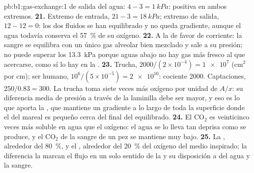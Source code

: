 \begin{solution}{pb:b1:gas-exchange:1}
de salida del agua: $4 - 3 = \qty{1}{kPa}$: positiva en ambos extremos.
\textbf{21.} Extremo de entrada, $21 - 3 = \qty{18}{kPa}$; extremo de
salida, $12 - 12 =
0$: los dos fluidos se han equilibrado y no queda
gradiente, aunque el agua todavía conserva el \qty{57}{\%} de su oxígeno.
\textbf{22.} A la de favor de corriente: la sangre se equilibra con un único
gas alveolar bien mezclado y sale a su presión; no puede superar los
\qty{13.3}{kPa} porque aguas abajo no hay gas más fresco al que acercarse,
como sí lo hay en la .
\textbf{23.} Trucha, $2000/(2\times 10^{-4}) = \num{1e7}$ (cm$^2$ por cm);
ser humano, $10^6/(5\times 10^{-5}) = \num{2e10}$: cociente \num{2000}.
Captaciones, $250/0.83 = 300$. La trucha toma siete veces más oxígeno por
unidad de $A/x$: su diferencia media de presión a través de la laminilla
debe ser mayor, y eso es lo que aporta la , que mantiene un
gradiente a lo largo de toda la superficie donde el del  mareal es
pequeño cerca del final del equilibrado.
\textbf{24.} El $\mathrm{CO_2}$ es veinticinco veces más soluble en agua que
el oxígeno: el agua se lo lleva tan deprisa como se produce, y el
$\mathrm{CO_2}$ de la sangre de un pez se mantiene muy bajo.
\textbf{25.} La , alrededor del \qty{80}{\%}, y el , alrededor
del \qty{20}{\%} del oxígeno del medio inspirado; la diferencia la marcan el
flujo en un solo sentido de la  y su disposición a 
del agua y la sangre.
\end{solution}
